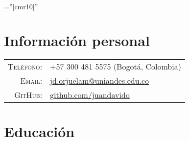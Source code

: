 \documentclass[a4paper,10pt]{article} %
\begin{document}
\pagestyle{empty} %

\font\fb=''[cmr10]'' %



\par{ \bigskip\par} %
\par{\bigskip\par} %

\color{OrangeRed}
\section{Información personal}
\color{black}

\begin{tabular}{rl}
\textsc{Teléfono:} & +57 300 481 5575 (Bogot\'a, Colombia)\\
\textsc{Email:} & \href{mailto:jd.orjuelam@uniandes.edu.co}{jd.orjuelam@uniandes.edu.co}\\
\textsc{GitHub:} & \url{github.com/juandavido}
\end{tabular}


\color{OrangeRed}
\section{Educación}
\color{black}
\end{document}

